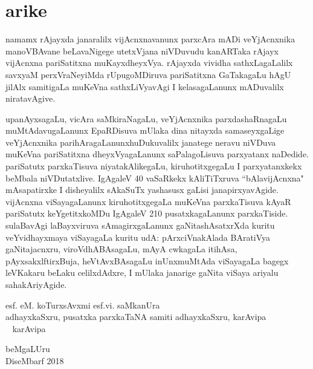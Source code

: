 \chapter*{arike}

namamx rAjayxda janaralilx vijAcnxnavanunx parxcAra mADi veYjAcnxnika manoVBAvane beLavaNi\-gege utetxVjana niVDuvudu kanARTaka rAjayx vijAcnxna pariSatitxna muKayxdheyxVya. rAjayxda vividha sathxLagaLalilx savxyaM perxVraNeyiMda rUpugoMDiruva pariSatitxna GaTakagaLu hAgU jilAlx samitigaLa muKeVna sathxLiVyavAgi I kelasagaLanunx mADuvalilx niratavAgive.

upanAyxsagaLu, vicAra saMkiraNagaLu, veYjAcnxnika parxdashaRnagaLu muMtAdavu\break gaLanunx EpaRDisuva mUlaka dina nitayxda samaseyxgaLige veYjAcnxnika parihAragaLanunx\break huDukuvalilx janatege neravu niVDuva muKeVna pariSatitxna dheyxVyagaLanunx saPalagoLisuva parxyatanx naDedide. pariSatutx parxkaTisuva niyatakAlikegaLu, kiruhotitxgegaLu I parxyatanxkekx\- beMbala niVDutatxlive. IgAgaleV {\rm 40} vaSaRkekx kAliTiTxruva ``bAlavijAcnxna" mAsa\-patirxke I disheyalilx sAkaSuTx yashasusx gaLisi janapirxyavAgide. vijAcnxna viSayagaLanunx kiru\-hotitxgegaLa muKeVna parxkaTisuva kAyaR pariSatutx keYgetitxkoMDu IgAgaleV {\rm 210} pusatxka\-gaLanunx parxkaTiside. sulaBavAgi laBayxviruva sAmagirxgaLanunx gaNitashAsatxrXda kuritu veYvidhayx\-maya viSayagaLa kuritu udA: pArxciVnakAlada BAratiVya gaNitajacnxru, viroVdhA\-BAsagaLu, mAyA cwkagaLa itihAsa, pAyxsakxlftirxBuja, heVtAvxBAsagaLu inUnx\break  muMtAda viSayagaLa bagegx leVKakaru beLaku celilxdAdxre, I mUlaka janarige gaNita viSaya ariyalu sahakAriyAgide.


\bigskip
\medskip

\noindent
\quad 
esf. eM. koTurxsAvxmi \hfill  esf.vi. saMkanUra\\
adhayxkaSxru, pusatxka parxkaTaNA samiti \hfill adhayxkaSxru, karAvipa\\
~\phantom{AAAAA~} karAvipa

\bigskip

\noindent
beMgaLUru\\
DiseMbarf {\rm  2018}
